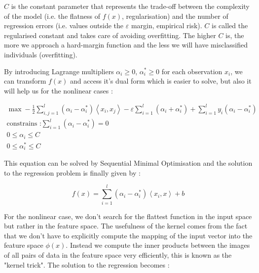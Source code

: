 \documentclass[11pt,a4paper,oneside]{book}
\begin{document}
$C$\label{cost} is the constant parameter that represents the trade-off between the complexity of the model (i.e. the flatness of $f\left ( x \right )$, regularisation) and the number of regression errors (i.e. values outside the $\varepsilon$ margin, empirical risk). $C$ is called the regularised constant and takes care of avoiding overfitting. The higher $C$ is, the more we approach a hard-margin function and the less we will have misclassified individuals (overfitting).


By introducing Lagrange multipliers $\alpha_i \geq 0$, $\alpha_i^*\geq 0$ for each observation $x_i$, we can transform  $f\left ( x \right )$ and access it's dual form which is easier to solve, but also it will help us for the nonlinear cases \cite{Cortes}\cite{Smola} : 


\begin{equation}
\begin{matrix}
\max -\frac{1}{2} \sum_{i,j = 1}^l \left ( \alpha _i - \alpha _i^* \right )\left \langle x_i, x_j \right \rangle - \varepsilon\sum_{i=1}^l\left ( \alpha _i + \alpha _i^* \right ) + \sum_{i=1}^l y_i\left ( \alpha _i - \alpha _i^* \right )\\
\text{constrains :}
\sum_{i=1}^l \left ( \alpha _i - \alpha _i^* \right) = 0 \\
0 \leq \alpha _i \leq C \\
0 \leq \alpha _i^* \leq C
\end{matrix}
\end{equation}


This equation can be solved by Sequential Minimal Optimisation and the solution to the regression problem is finally given by \cite{Cortes}\cite{Smola}:

\begin{equation}
f\left ( x \right ) = \sum_{i=1}^l \left ( \alpha_i - \alpha_i^* \right )\left \langle x_i, x \right \rangle + b
\end{equation}



For the nonlinear case, we don't search for the flattest function in the input space but rather in the feature space. The usefulness of the kernel comes from the fact that we don't have to explicitly compute the mapping of the input vector into the feature space $\phi(x)$. Instead we compute the inner products between the images of all pairs of data in the feature space very efficiently, this is known as the "kernel trick". The solution to the regression becomes :
\end{document}
